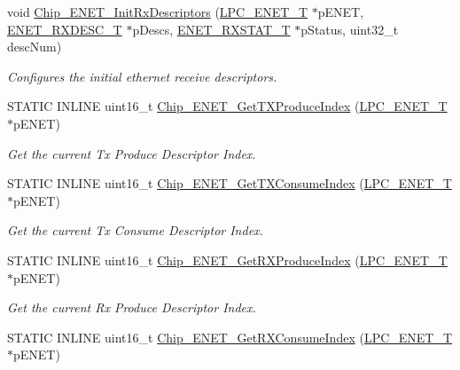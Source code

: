 \begin{DoxyCompactItemize}
void \hyperlink{group___e_n_e_t__17_x_x__40_x_x_ga04559be4fcfb24203ce9e372750383c1}{Chip\+\_\+\+E\+N\+E\+T\+\_\+\+Init\+Rx\+Descriptors} (\hyperlink{struct_l_p_c___e_n_e_t___t}{L\+P\+C\+\_\+\+E\+N\+E\+T\+\_\+\+T} $\ast$p\+E\+N\+E\+T, \hyperlink{struct_e_n_e_t___r_x_d_e_s_c___t}{E\+N\+E\+T\+\_\+\+R\+X\+D\+E\+S\+C\+\_\+\+T} $\ast$p\+Descs, \hyperlink{struct_e_n_e_t___r_x_s_t_a_t___t}{E\+N\+E\+T\+\_\+\+R\+X\+S\+T\+A\+T\+\_\+\+T} $\ast$p\+Status, uint32\+\_\+t desc\+Num)
\begin{DoxyCompactList}\small\item\em Configures the initial ethernet receive descriptors. \end{DoxyCompactList}\item 
S\+T\+A\+T\+I\+C I\+N\+L\+I\+N\+E uint16\+\_\+t \hyperlink{group___e_n_e_t__17_x_x__40_x_x_ga276d359d20f70fdb005740c3287dd2d7}{Chip\+\_\+\+E\+N\+E\+T\+\_\+\+Get\+T\+X\+Produce\+Index} (\hyperlink{struct_l_p_c___e_n_e_t___t}{L\+P\+C\+\_\+\+E\+N\+E\+T\+\_\+\+T} $\ast$p\+E\+N\+E\+T)
\begin{DoxyCompactList}\small\item\em Get the current Tx Produce Descriptor Index. \end{DoxyCompactList}\item 
S\+T\+A\+T\+I\+C I\+N\+L\+I\+N\+E uint16\+\_\+t \hyperlink{group___e_n_e_t__17_x_x__40_x_x_ga6ed1ce4f6bde22c64966d2d513cc7a6d}{Chip\+\_\+\+E\+N\+E\+T\+\_\+\+Get\+T\+X\+Consume\+Index} (\hyperlink{struct_l_p_c___e_n_e_t___t}{L\+P\+C\+\_\+\+E\+N\+E\+T\+\_\+\+T} $\ast$p\+E\+N\+E\+T)
\begin{DoxyCompactList}\small\item\em Get the current Tx Consume Descriptor Index. \end{DoxyCompactList}\item 
S\+T\+A\+T\+I\+C I\+N\+L\+I\+N\+E uint16\+\_\+t \hyperlink{group___e_n_e_t__17_x_x__40_x_x_gaa70d279d6bb31b783656b31fe3a1cf8f}{Chip\+\_\+\+E\+N\+E\+T\+\_\+\+Get\+R\+X\+Produce\+Index} (\hyperlink{struct_l_p_c___e_n_e_t___t}{L\+P\+C\+\_\+\+E\+N\+E\+T\+\_\+\+T} $\ast$p\+E\+N\+E\+T)
\begin{DoxyCompactList}\small\item\em Get the current Rx Produce Descriptor Index. \end{DoxyCompactList}\item 
S\+T\+A\+T\+I\+C I\+N\+L\+I\+N\+E uint16\+\_\+t \hyperlink{group___e_n_e_t__17_x_x__40_x_x_gae79ff7cdffb9e43c95fb309ca7c16aa2}{Chip\+\_\+\+E\+N\+E\+T\+\_\+\+Get\+R\+X\+Consume\+Index} (\hyperlink{struct_l_p_c___e_n_e_t___t}{L\+P\+C\+\_\+\+E\+N\+E\+T\+\_\+\+T} $\ast$p\+E\+N\+E\+T)

\end{DoxyCompactItemize}
